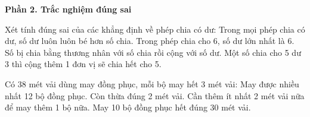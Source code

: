 \textbf{Phần 2. Trắc nghiệm đúng sai}

\begin{ex} %
Xét tính đúng sai của các khẳng định về phép chia có dư:
\choiceTF
{\True Trong mọi phép chia có dư, số dư luôn luôn bé hơn số chia.}
{Trong phép chia cho 6, số dư lớn nhất là 6.}
{\True Số bị chia bằng thương nhân với số chia rồi cộng với số dư.}
{Một số chia cho 5 dư 3 thì cộng thêm 1 đơn vị sẽ chia hết cho 5.}
\end{ex}

\begin{ex} %
Có 38 mét vải dùng may đồng phục, mỗi bộ may hết 3 mét vải:
\choiceTF
{\True May được nhiều nhất 12 bộ đồng phục.}
{\True Còn thừa đúng 2 mét vải.}
{Cần thêm ít nhất 2 mét vải nữa để may thêm 1 bộ nữa.}
{\True May 10 bộ đồng phục hết đúng 30 mét vải.}
\end{ex}

